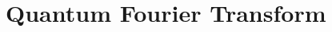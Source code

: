 \documentclass[12pt]{dalthesis}
\begin{document}
\section{Quantum Fourier Transform}
\begin{comment}
To establish lower bounds for adder circuits we will use the fact that adder can create a complex conjugate copy of a Fourier state. Our strategy is to generalize $\mu_2$ to be defined on a wider set of states including Fourier states. This is achieved by extending the domain of $v_2$ to a wider set of values. Now we will list and discuss properties of $v_2$ needed for the lower-bound proof and prove the lower bound for the adder using them. 


We will now need to define rings we can use to write down the coordinates of Fourier states, and not just $\ket{C^nZ}$ states. To do this we extend the domain of $\mu_2$ to the union of the following family of sets:
\begin{center}
$\mathcal{R}_d = \mathbb{Z} \big[ exp(i\pi /2^d), 1/2 \big] = \Big\{ \frac{1}{2^k} \sum\limits_{j=0}^{2^d - 1} a_j \texttt{exp}(i\pi j/2^d): \texttt{where } a_j, k \texttt{ are integers} \Big\}$
\end{center}
Note that $\mathcal{R}_d$ is closed under addition, negation, and multiplication making it a ring, and furthermore that it is closed under taking complex conjugates. Also note that $\mathcal{R}_1 = \mathbb{Z}[i, 1/2]$ and $\mathcal{R}_d \subset \mathcal{R}_{d+1}$ for all positive $d$.

We extend the domain of $v_2$ so it is defined on values of Pauli expectations of Fourier states, and so $v_2$ must be defined at least on the real subsets of $\mathcal{R}_d$. The proof of the lower bound for multiply-controlled-$Z$ gate relied on additivity for a tensor product of states and monotonicity under measurements with probability $1/2$ of dyadic monotone $\mu_2$. In turn, our proofs of the mentioned properties of $\mu_2$ relied on the properties: $v_2(a \cdot b) = v_2(a) + v_2(b)$ and $v_2(a+b) \geq \texttt{min}(v_2(a), v_2(b))$. All these properties also hold for the extension of $v_2$, and now note some explicit values of $v_2$ that we will need to compute $\mu_2$ for Fourier states:
\begin{equation}
\mbox{For all odd integers } k \mbox{, integers } d \geq 2: v_2(cos(\pi k/2^d)) = v_2(sin(\pi k /2^d)) = \frac{1}{2^{d-1}} - 1
\end{equation}

For example, using above we see that $\mu_2\ket{T} = 1/2$ because $v_2(1/\sqrt{2}) = -1/2$. We can immediately conclude that the $C^nZ$ gate requires at least $2(n-2)\ket{T}$ states. Next we proceed to calculate $\mu_2$ for Fourier states.
\end{comment}
\end{document}

